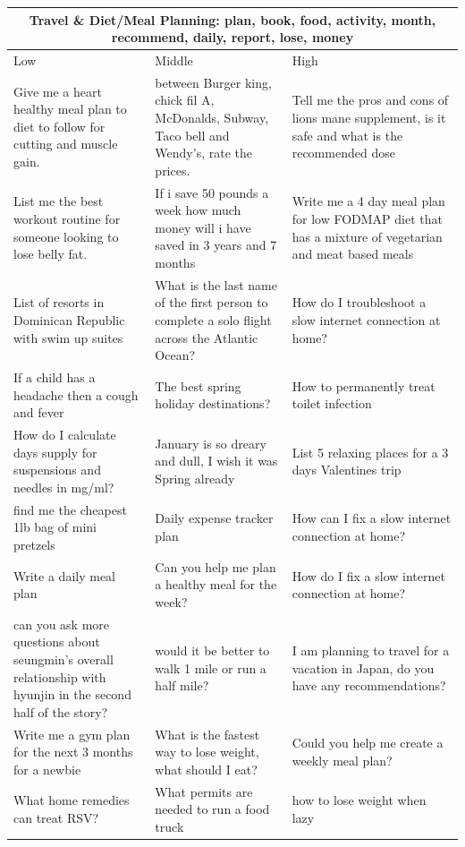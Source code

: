 \begin{table}[ht]
\centering
\small
\begin{tabular}{p{4.3cm}p{4.3cm}p{4.3cm}}
\toprule
\multicolumn{3}{c}{\textbf{Travel \& Diet/Meal Planning: plan, book, food, activity, month, recommend, daily, report, lose, money}} \\
\midrule
Low & Middle & High \\
\midrule
Give me a heart healthy meal plan to diet to follow for cutting and muscle gain. & between Burger king, chick fil A, McDonalds, Subway, Taco bell and Wendy's, rate the prices. & Tell me the pros and cons of lions mane supplement, is it safe and what is the recommended dose \\[4pt]
List me the best workout routine for someone looking to lose belly fat. & If i save 50 pounds a week how much money will i have saved in 3 years and 7 months & Write me a 4 day meal plan for low FODMAP diet that has a mixture of vegetarian and meat based meals \\[4pt]
List of resorts in Dominican Republic with swim up suites & What is the last name of the first person to complete a solo flight across the Atlantic Ocean? & How do I troubleshoot a slow internet connection at home? \\[4pt]
If a child has a headache then a cough and fever & The best spring holiday destinations? & How to permanently treat toilet infection \\[4pt]
How do I calculate days supply for suspensions and needles in mg/ml? & January is so dreary and dull, I wish it was Spring already & List 5 relaxing places for a 3 days Valentines trip \\[4pt]
find me the cheapest 1lb bag of mini pretzels & Daily expense tracker plan & How can I fix a slow internet connection at home? \\[4pt]
Write a daily meal plan & Can you help me plan a healthy meal for the week? & How do I fix a slow internet connection at home? \\[4pt]
can you ask more questions about seungmin's overall relationship with hyunjin in the second half of the story? & would it be better to walk 1 mile or run a half mile? & I am planning to travel for a vacation in Japan, do you have any recommendations? \\[4pt]
Write me a gym plan for the next 3 months for a newbie & What is the fastest way to lose weight, what should I eat? & Could you help me create a weekly meal plan? \\[4pt]
What home remedies can treat RSV? & What permits are needed to run a food truck & how to lose weight when lazy \\[4pt]

\end{tabular}
\end{table}
